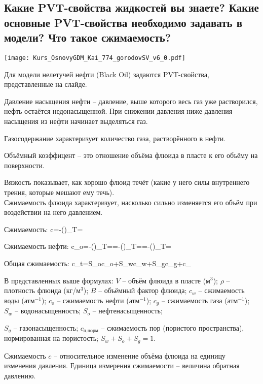 

\subsection{Какие PVT-свойства жидкостей вы знаете? Какие основные PVT-свойства необходимо задавать в модели? Что такое сжимаемость?}

\texttt{[image: Kurs\_OsnovyGDM\_Kai\_774\_gorodovSV\_v6\_0.pdf]}

Для модели нелетучей нефти (Black Oil) задаются PVT-свойства, представленные на слайде.

Давление насыщения нефти -- давление, выше которого весь газ уже растворился, нефть остаётся недонасыщенной.
При снижении давления ниже давления насыщения из нефти начинает выделяться газ.

Газосодержание характеризует количество газа, растворённого в нефти.

Объёмный коэффицент -- это отношение объёма флюида в пласте к его объёму на поверхности.

Вязкость показывает, как хорошо флюид течёт (какие у него силы внутреннего трения, которые мешают ему течь).
\\

Сжимаемость флюида характеризует, насколько сильно изменяется его объём при воздействии на него давлением.

Сжимаемость:
\beq
c=-\left(\right)_{T=}
\eeq

Сжимаемость нефти:
\beq
c_o=-\left(\right)_{T=}=-\left(\right)_{T=}=-\left(\right)_{T=}
\eeq

Общая сжимаемость:
\beq
c_t=S_oc_o+S_wc_w+S_gc_g+c_{}
\eeq

В представленных выше формулах:
$V$ -- объём флюида в пласте (м$^3$);
$\rho$ -- плотность флюида (кг/м$^3$);
$B$ -- объёмный фактор флюида;
$c_w$ -- сжимаемость воды (атм$^{-1}$);
$c_o$ -- сжимаемость нефти (атм$^{-1}$);
$c_g$ -- сжимаемость газа (атм$^{-1}$);
$S_w$ -- водонасыщенность;
$S_o$ -- нефтенасыщенность;

$S_g$ -- газонасыщенность;
$c_\text{п,норм}$ -- сжимаемость пор (пористого пространства), нормированная на пористость;
$S_w+S_o+S_g=1$.

Сжимаемость $c$ -- относительное изменение объёма флюида на единицу изменения давления.
Единица измерения сжимаемости -- величина обратная давлению.
\\

